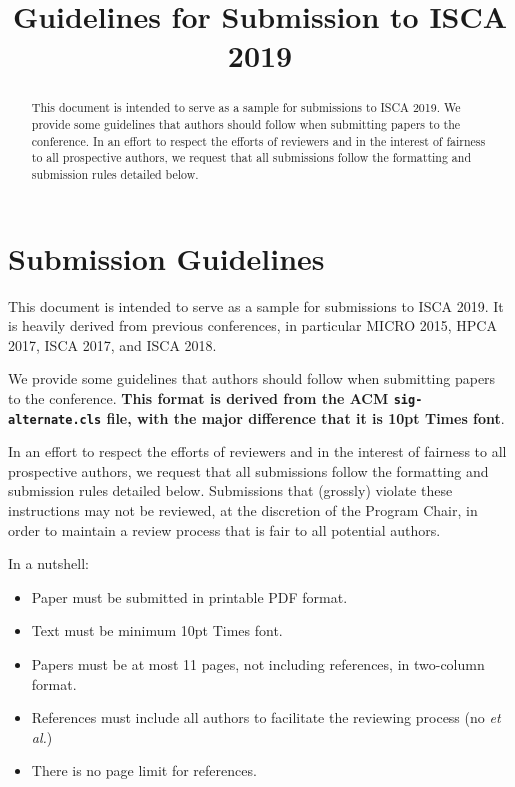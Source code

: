 \documentclass{sig-alternate}
\title{Guidelines for Submission to ISCA 2019}
\author{}
\begin{document}
\maketitle
\thispagestyle{firstpage}
\pagestyle{plain}

\begin{abstract}

This document is intended to serve as a sample for submissions to ISCA 2019. We provide some guidelines that authors should follow when submitting papers to the conference. In an effort to respect the efforts of reviewers and in the interest of fairness to all prospective authors, we request that all submissions follow the formatting and submission rules detailed below. 

\end{abstract}

\section{Submission Guidelines}

This document is intended to serve as a sample for submissions to ISCA 2019. It is heavily derived from previous conferences, in particular MICRO 2015, HPCA 2017, ISCA 2017, and ISCA 2018.

We provide some guidelines that authors should follow when submitting papers to the conference. \textbf{This format is derived from the ACM \texttt{sig-alternate.cls} file, with the major difference that it is 10pt Times font}.

In an effort to respect the efforts of reviewers and in the interest of fairness to all prospective authors, we request that all submissions follow the formatting and submission rules detailed below. Submissions that (grossly) violate these instructions may not be reviewed, at the discretion of the Program Chair, in order to maintain a review process that is fair to all potential authors.

\vspace{1ex}In a nutshell:

\begin{itemize}
\item Paper must be submitted in printable PDF format.
\item Text must be minimum 10pt Times font.
\item Papers must be at most 11 pages, not including references, in two-column format.
\item References must include all authors to facilitate the reviewing process (no \emph{et al.})
\item There is no page limit for references.
\end{itemize}
\end{document}
